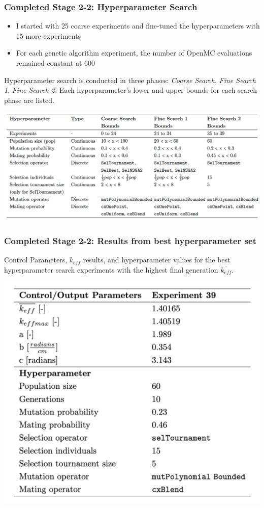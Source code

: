 \begin{frame}
    \frametitle{Completed Stage 2-2: Hyperparameter Search}
    \begin{itemize}
        \item I started with 25 coarse experiments and fine-tuned the hyperparameters
        with 15 more experiments
        \item For each genetic algorithm experiment, the number 
        of OpenMC evaluations remained constant at 600
    \end{itemize}
    \begin{table}
        \caption{Hyperparameter search is conducted in three phases: \textit{Coarse Search}, 
    \textit{Fine Search 1}, \textit{Fine Search 2}. Each hyperparameter's lower and
    upper bounds for each search phase are listed.}
        \includegraphics[width=0.8\linewidth]{figures/hyperparameter-search.png} 
    \end{table}
\end{frame}


\begin{frame}
    \frametitle{Completed Stage 2-2: Results from best hyperparameter set}
    \begin{table}
        \caption{Control Parameters, $k_{eff}$ results, and hyperparameter values for 
        the best hyperparameter search experiments with the highest final generation 
        $\overline{k_{eff}}$.}
        \includegraphics[width=0.6\linewidth]{figures/rollo-demo-best.png} 
    \end{table}
\end{frame}


